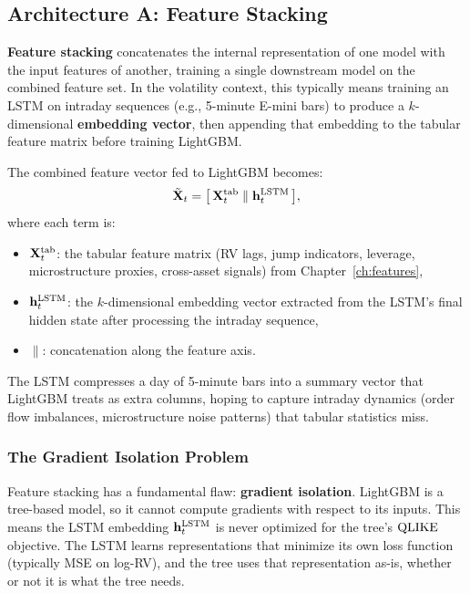 \subsection{Architecture A: Feature Stacking}\label{sec:hybrid:feat-stack}

\textbf{Feature stacking} concatenates the internal representation of one
model with the input features of another, training a single downstream
model on the combined feature set.  In the volatility context, this
typically means training an LSTM on intraday sequences (e.g., 5-minute
E-mini bars) to produce a $k$-dimensional \textbf{embedding vector},
then appending that embedding to the tabular feature matrix before
training LightGBM.

The combined feature vector fed to LightGBM becomes:
\begin{equation}\label{eq:feat-stack}
  \tilde{\mathbf{X}}_t = \bigl[\,\mathbf{X}_t^{\text{tab}} \;\|\;
    \mathbf{h}_t^{\text{LSTM}}\,\bigr],
\end{equation}
where each term is:
\begin{itemize}
  \item $\mathbf{X}_t^{\text{tab}}$: the tabular feature matrix (RV lags,
        jump indicators, leverage, microstructure proxies, cross-asset
        signals) from Chapter~\ref{ch:features},
  \item $\mathbf{h}_t^{\text{LSTM}}$: the $k$-dimensional embedding vector
        extracted from the LSTM's final hidden state after processing the
        intraday sequence,
  \item $\|$: concatenation along the feature axis.
\end{itemize}

\begin{intuition}
The LSTM compresses a day of 5-minute bars into a summary vector that
LightGBM treats as extra columns, hoping to capture intraday dynamics
(order flow imbalances, microstructure noise patterns) that tabular
statistics miss.
\end{intuition}

\subsubsection{The Gradient Isolation Problem}

Feature stacking has a fundamental flaw: \textbf{gradient isolation}.
LightGBM is a tree-based model, so it cannot compute gradients with
respect to its inputs.  This means the LSTM embedding
$\mathbf{h}_t^{\text{LSTM}}$ is never optimized for the tree's $\operatorname{QLIKE}$
objective.  The LSTM learns representations that minimize its own loss
function (typically MSE on log-RV), and the tree uses that
representation as-is, whether or not it is what the tree needs.

